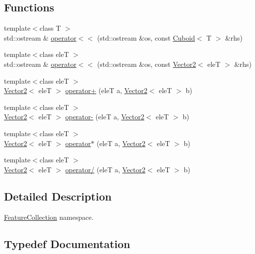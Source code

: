 \subsection*{Functions}
\begin{DoxyCompactItemize}
\item 
{\footnotesize template$<$class T $>$ }\\std\+::ostream \& \hyperlink{namespacefc_a032cdf3cc33e52b02c4b66f65fc532b2}{operator$<$$<$} (std\+::ostream \&os, const \hyperlink{classfc_1_1Cuboid}{Cuboid}$<$ T $>$ \&rhs)
\item 
{\footnotesize template$<$class eleT $>$ }\\std\+::ostream \& \hyperlink{namespacefc_a17fbd695ac7dd053e973c0e60f93061c}{operator$<$$<$} (std\+::ostream \&os, const \hyperlink{classfc_1_1Vector2}{Vector2}$<$ eleT $>$ \&rhs)
\item 
{\footnotesize template$<$class eleT $>$ }\\\hyperlink{classfc_1_1Vector2}{Vector2}$<$ eleT $>$ \hyperlink{namespacefc_a54dd7df4c8a01e800426c7aefe3b349b}{operator+} (eleT a, \hyperlink{classfc_1_1Vector2}{Vector2}$<$ eleT $>$ b)
\item 
{\footnotesize template$<$class eleT $>$ }\\\hyperlink{classfc_1_1Vector2}{Vector2}$<$ eleT $>$ \hyperlink{namespacefc_a851bc28427c29f20a4433485c0ae7afd}{operator-\/} (eleT a, \hyperlink{classfc_1_1Vector2}{Vector2}$<$ eleT $>$ b)
\item 
{\footnotesize template$<$class eleT $>$ }\\\hyperlink{classfc_1_1Vector2}{Vector2}$<$ eleT $>$ \hyperlink{namespacefc_a29cd1b829e901810afd80ee5f75cdcc2}{operator$\ast$} (eleT a, \hyperlink{classfc_1_1Vector2}{Vector2}$<$ eleT $>$ b)
\item 
{\footnotesize template$<$class eleT $>$ }\\\hyperlink{classfc_1_1Vector2}{Vector2}$<$ eleT $>$ \hyperlink{namespacefc_a639753beb1103357bce89497028a1443}{operator/} (eleT a, \hyperlink{classfc_1_1Vector2}{Vector2}$<$ eleT $>$ b)
\end{DoxyCompactItemize}


\subsection{Detailed Description}
\hyperlink{classfc_1_1FeatureCollection}{Feature\+Collection} namespace. 

\subsection{Typedef Documentation}
\mbox{\label{namespacefc_a7da125cb1e99553c27c07139ee8a62ca}} 

